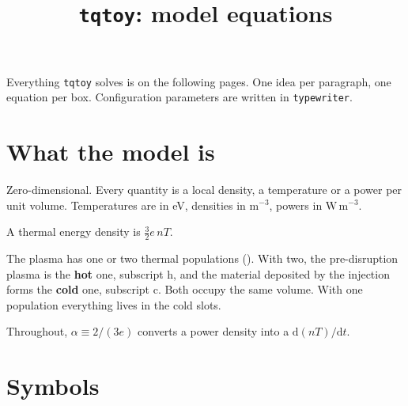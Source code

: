 \documentclass[11pt,a4paper]{article}
\title{\texttt{tqtoy}: model equations}
\date{}
\newcommand{\h}{\mathrm{h}}
\newcommand{\co}{\mathrm{c}}
\begin{document}
\maketitle

Everything \texttt{tqtoy} solves is on the following pages. One idea per paragraph, one
equation per box. Configuration parameters are written in \texttt{typewriter}.

\section{What the model is}

Zero-dimensional. Every quantity is a local density, a temperature or a power per unit volume.
Temperatures are in eV, densities in $\mathrm{m^{-3}}$, powers in $\mathrm{W\,m^{-3}}$.

A thermal energy density is $\tfrac{3}{2} e\, n T$.

The plasma has one or two thermal populations (). With two, the
pre-disruption plasma is the \textbf{hot} one, subscript $\h$, and the material deposited by the
injection forms the \textbf{cold} one, subscript $\co$. Both occupy the same volume. With one
population everything lives in the cold slots.

Throughout, $\alpha \equiv 2/(3e)$ converts a power density into a $\mathrm{d}(nT)/\mathrm{d}t$.

\section{Symbols}
\end{document}
